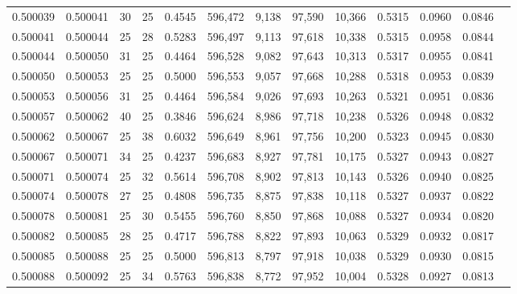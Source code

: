 \begin{tabular}{rrrrrrrrrrrrr}
0.500039 & 0.500041 &    30 &  25 &                                     0.4545 & 596,472 &   9,138 &  97,590 &  10,366 & 0.5315 & 0.0960 & 0.0846 \\
0.500041 & 0.500044 &    25 &  28 &                                     0.5283 & 596,497 &   9,113 &  97,618 &  10,338 & 0.5315 & 0.0958 & 0.0844 \\
0.500044 & 0.500050 &    31 &  25 &                                     0.4464 & 596,528 &   9,082 &  97,643 &  10,313 & 0.5317 & 0.0955 & 0.0841 \\
0.500050 & 0.500053 &    25 &  25 &                                     0.5000 & 596,553 &   9,057 &  97,668 &  10,288 & 0.5318 & 0.0953 & 0.0839 \\
0.500053 & 0.500056 &    31 &  25 &                                     0.4464 & 596,584 &   9,026 &  97,693 &  10,263 & 0.5321 & 0.0951 & 0.0836 \\
0.500057 & 0.500062 &    40 &  25 &                                     0.3846 & 596,624 &   8,986 &  97,718 &  10,238 & 0.5326 & 0.0948 & 0.0832 \\
0.500062 & 0.500067 &    25 &  38 &                                     0.6032 & 596,649 &   8,961 &  97,756 &  10,200 & 0.5323 & 0.0945 & 0.0830 \\
0.500067 & 0.500071 &    34 &  25 &                                     0.4237 & 596,683 &   8,927 &  97,781 &  10,175 & 0.5327 & 0.0943 & 0.0827 \\
0.500071 & 0.500074 &    25 &  32 &                                     0.5614 & 596,708 &   8,902 &  97,813 &  10,143 & 0.5326 & 0.0940 & 0.0825 \\
0.500074 & 0.500078 &    27 &  25 &                                     0.4808 & 596,735 &   8,875 &  97,838 &  10,118 & 0.5327 & 0.0937 & 0.0822 \\
0.500078 & 0.500081 &    25 &  30 &                                     0.5455 & 596,760 &   8,850 &  97,868 &  10,088 & 0.5327 & 0.0934 & 0.0820 \\
0.500082 & 0.500085 &    28 &  25 &                                     0.4717 & 596,788 &   8,822 &  97,893 &  10,063 & 0.5329 & 0.0932 & 0.0817 \\
0.500085 & 0.500088 &    25 &  25 &                                     0.5000 & 596,813 &   8,797 &  97,918 &  10,038 & 0.5329 & 0.0930 & 0.0815 \\
0.500088 & 0.500092 &    25 &  34 &                                     0.5763 & 596,838 &   8,772 &  97,952 &  10,004 & 0.5328 & 0.0927 & 0.0813 \\

\end{tabular}

